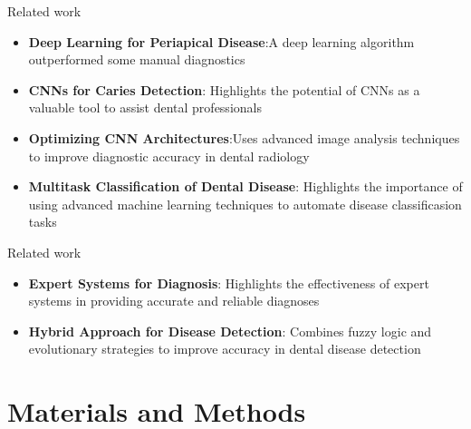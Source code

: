 \documentclass{beamer}
\begin{document}
\begin{frame}{Related work}
	\begin{itemize}
		\vfill
		\item \textbf{Deep Learning for Periapical Disease}:A deep learning algorithm outperformed some manual diagnostics\cite{endres2020development}
		\vfill
		\item \textbf{CNNs for Caries Detection}: Highlights the potential of CNNs as a valuable tool to assist dental professionals \cite{lee2018detection}
		\vfill
		\item \textbf{Optimizing CNN Architectures}:Uses advanced image analysis techniques to improve diagnostic accuracy in dental radiology \cite{chen2021dental}
		\vfill
		\item \textbf{Multitask Classification of Dental Disease}: Highlights the importance of using advanced machine learning techniques to automate disease classificasion tasks \cite{al2022detection}
	\end{itemize}
\end{frame}

\begin{frame}{Related work}
	\begin{itemize}
		\vfill
		\item \textbf{Expert Systems for Diagnosis}: Highlights the effectiveness of expert systems in providing accurate and reliable diagnoses \cite{setiabudi2017expert}
		\vfill
		\item \textbf{Hybrid Approach for Disease Detection}: Combines fuzzy logic and evolutionary strategies to improve accuracy in dental disease detection \cite{parewe2018dental}
	\end{itemize}
\end{frame}

\section[Materials and Methods]{Materials and Methods}
\end{document}
